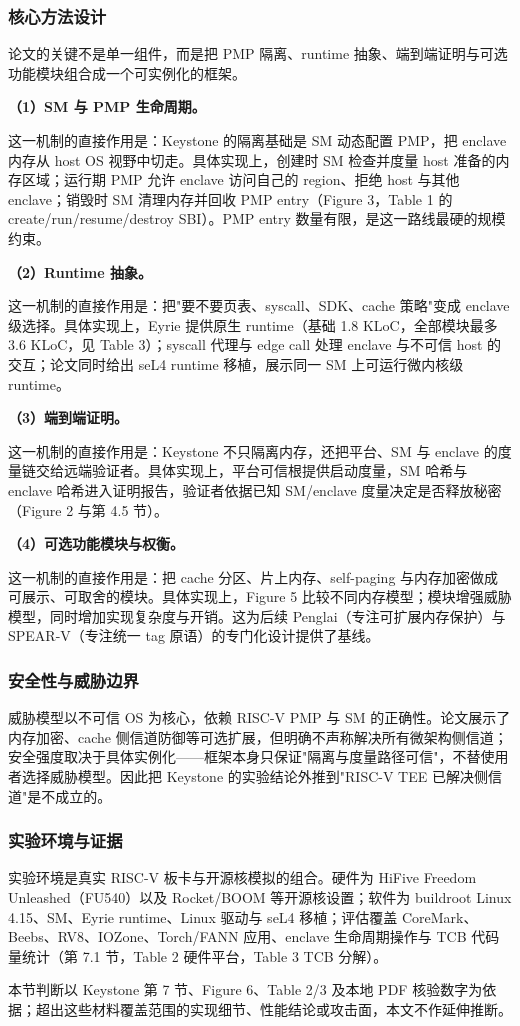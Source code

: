 \documentclass[11pt]{ctexart}
\begin{document}
\subsubsection{核心方法设计}
论文的关键不是单一组件，而是把 PMP 隔离、runtime 抽象、端到端证明与可选功能模块组合成一个可实例化的框架。\par
\noindent\textbf{（1）SM 与 PMP 生命周期。}\par
这一机制的直接作用是：Keystone 的隔离基础是 SM 动态配置 PMP，把 enclave 内存从 host OS 视野中切走。具体实现上，创建时 SM 检查并度量 host 准备的内存区域；运行期 PMP 允许 enclave 访问自己的 region、拒绝 host 与其他 enclave；销毁时 SM 清理内存并回收 PMP entry（Figure 3，Table 1 的 create/run/resume/destroy SBI）。PMP entry 数量有限，是这一路线最硬的规模约束。\par
\noindent\textbf{（2）Runtime 抽象。}\par
这一机制的直接作用是：把"要不要页表、syscall、SDK、cache 策略"变成 enclave 级选择。具体实现上，Eyrie 提供原生 runtime（基础 1.8 KLoC，全部模块最多 3.6 KLoC，见 Table 3）；syscall 代理与 edge call 处理 enclave 与不可信 host 的交互；论文同时给出 seL4 runtime 移植，展示同一 SM 上可运行微内核级 runtime。\par
\noindent\textbf{（3）端到端证明。}\par
这一机制的直接作用是：Keystone 不只隔离内存，还把平台、SM 与 enclave 的度量链交给远端验证者。具体实现上，平台可信根提供启动度量，SM 哈希与 enclave 哈希进入证明报告，验证者依据已知 SM/enclave 度量决定是否释放秘密（Figure 2 与第 4.5 节）。\par
\noindent\textbf{（4）可选功能模块与权衡。}\par
这一机制的直接作用是：把 cache 分区、片上内存、self-paging 与内存加密做成可展示、可取舍的模块。具体实现上，Figure 5 比较不同内存模型；模块增强威胁模型，同时增加实现复杂度与开销。这为后续 Penglai（专注可扩展内存保护）与 SPEAR-V（专注统一 tag 原语）的专门化设计提供了基线。\par
\subsubsection{安全性与威胁边界}
威胁模型以不可信 OS 为核心，依赖 RISC-V PMP 与 SM 的正确性。论文展示了内存加密、cache 侧信道防御等可选扩展，但明确不声称解决所有微架构侧信道；安全强度取决于具体实例化——框架本身只保证"隔离与度量路径可信"，不替使用者选择威胁模型。因此把 Keystone 的实验结论外推到"RISC-V TEE 已解决侧信道"是不成立的。\par
\subsubsection{实验环境与证据}
实验环境是真实 RISC-V 板卡与开源核模拟的组合。硬件为 HiFive Freedom Unleashed（FU540）以及 Rocket/BOOM 等开源核设置；软件为 buildroot Linux 4.15、SM、Eyrie runtime、Linux 驱动与 seL4 移植；评估覆盖 CoreMark、Beebs、RV8、IOZone、Torch/FANN 应用、enclave 生命周期操作与 TCB 代码量统计（第 7.1 节，Table 2 硬件平台，Table 3 TCB 分解）。\par
本节判断以 Keystone 第 7 节、Figure 6、Table 2/3 及本地 PDF 核验数字为依据；超出这些材料覆盖范围的实现细节、性能结论或攻击面，本文不作延伸推断。\par
\end{document}
